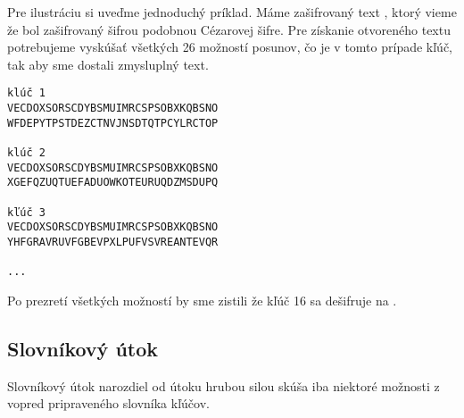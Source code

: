 Pre ilustráciu si uveďme jednoduchý príklad. Máme zašifrovaný text , ktorý vieme že bol zašifrovaný šifrou podobnou Cézarovej šifre.
Pre získanie otvoreného textu potrebujeme vyskúšať všetkých 26 možností posunov, čo je v tomto prípade kľúč, tak aby sme dostali zmysluplný text.

\begin{verbatim}
klúč 1
VECDOXSORSCDYBSMUIMRCSPSOBXKQBSNO
WFDEPYTPSTDEZCTNVJNSDTQTPCYLRCTOP

klúč 2
VECDOXSORSCDYBSMUIMRCSPSOBXKQBSNO
XGEFQZUQTUEFADUOWKOTEURUQDZMSDUPQ

kľúč 3
VECDOXSORSCDYBSMUIMRCSPSOBXKQBSNO
YHFGRAVRUVFGBEVPXLPUFVSVREANTEVQR

...
\end{verbatim}

Po prezretí všetkých možností by sme zistili že kľúč 16 sa dešifruje na .


\subsection{Slovníkový útok}
Slovníkový útok narozdiel od útoku hrubou silou skúša iba niektoré možnosti z vopred pripraveného slovníka kľúčov.